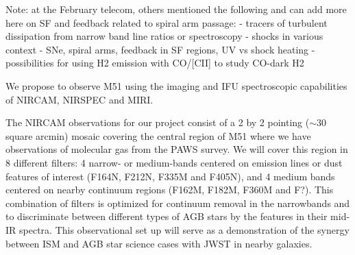 \documentclass[12pt]{article}
\begin{document}
Note: at the February telecom, others mentioned the following and can add more here on SF and feedback related to spiral arm passage:
        - tracers of turbulent dissipation from narrow band line ratios or spectroscopy
        - shocks in various context - SNe, spiral arms, feedback in SF regions, UV vs shock heating
        - possibilities for using H2 emission with CO/[CII] to study CO-dark H2


%

\describeobservations   %


We propose to observe M51 using the imaging and IFU spectroscopic capabilities of NIRCAM, NIRSPEC and MIRI.  

\vspace{0.1in}

 The NIRCAM observations for our project consist of a 2 by 2 pointing ($\sim30$ square arcmin) mosaic covering the central region of M51 where we have observations of molecular gas from the PAWS survey.  We will cover this region in 8 different filters: 4 narrow- or medium-bands centered on emission lines or dust features of interest (F164N, F212N, F335M and F405N), and 4 medium bands centered on nearby continuum regions (F162M, F182M, F360M and F?). This combination of filters is optimized for continuum removal in the narrowbands and to discriminate between different types of AGB stars by the features in their mid-IR spectra.  This observational set up will serve as a demonstration of the synergy between ISM and AGB star science cases with JWST in nearby galaxies.
\end{document}
